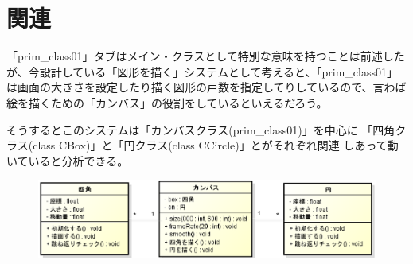 \documentclass[uplatex,a4j,11pt]{jsarticle}
\renewcommand{\baselinestretch}{1.08}
\begin{document}
%
%  
%
%


\section{関連}

「prim\_class01」タブはメイン・クラスとして特別な意味を持つことは前述した
が、今設計している「図形を描く」システムとして考えると、「prim\_class01」
は画面の大きさを設定したり描く図形の戸数を指定してりしているので、言わば
絵を描くための「カンバス」の役割をしているといえるだろう。

そうするとこのシステムは「カンバスクラス(prim\_class01)」を中心に
「四角クラス(class CBox)」と「円クラス(class CCircle)」とがそれぞれ関連
しあって動いていると分析できる。

\begin{figure}[H]
  \begin{center}
   \includegraphics[width=.7\paperwidth]{zu9.eps}
   \caption{}
   \label{zu6}
  \end{center}
\end{figure}
\end{document}
